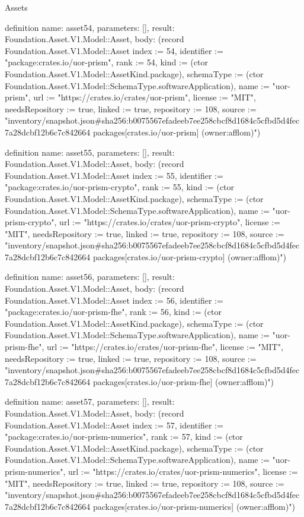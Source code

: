 \begin{lexlean}{Assets}
\begin{semanticmodule}
definition{
  name: asset54,
  parameters: [],
  result: Foundation.Asset.V1.Model::Asset,
  body: (record Foundation.Asset.V1.Model::Asset {index := 54, identifier := "package:crates.io/uor-prism", rank := 54, kind := (ctor Foundation.Asset.V1.Model::AssetKind.package), schemaType := (ctor Foundation.Asset.V1.Model::SchemaType.softwareApplication), name := "uor-prism", url := "https://crates.io/crates/uor-prism", license := "MIT", needsRepository := true, linked := true, repository := 108, source := "inventory/snapshot.json#sha256:b0075567efadeeb7ee258cbcf8d1684c5cfbd5d4fec7a28dcbf12b6c7c842664 packages[crates.io/uor-prism] (owner:afflom)"})
}

definition{
  name: asset55,
  parameters: [],
  result: Foundation.Asset.V1.Model::Asset,
  body: (record Foundation.Asset.V1.Model::Asset {index := 55, identifier := "package:crates.io/uor-prism-crypto", rank := 55, kind := (ctor Foundation.Asset.V1.Model::AssetKind.package), schemaType := (ctor Foundation.Asset.V1.Model::SchemaType.softwareApplication), name := "uor-prism-crypto", url := "https://crates.io/crates/uor-prism-crypto", license := "MIT", needsRepository := true, linked := true, repository := 108, source := "inventory/snapshot.json#sha256:b0075567efadeeb7ee258cbcf8d1684c5cfbd5d4fec7a28dcbf12b6c7c842664 packages[crates.io/uor-prism-crypto] (owner:afflom)"})
}

definition{
  name: asset56,
  parameters: [],
  result: Foundation.Asset.V1.Model::Asset,
  body: (record Foundation.Asset.V1.Model::Asset {index := 56, identifier := "package:crates.io/uor-prism-fhe", rank := 56, kind := (ctor Foundation.Asset.V1.Model::AssetKind.package), schemaType := (ctor Foundation.Asset.V1.Model::SchemaType.softwareApplication), name := "uor-prism-fhe", url := "https://crates.io/crates/uor-prism-fhe", license := "MIT", needsRepository := true, linked := true, repository := 108, source := "inventory/snapshot.json#sha256:b0075567efadeeb7ee258cbcf8d1684c5cfbd5d4fec7a28dcbf12b6c7c842664 packages[crates.io/uor-prism-fhe] (owner:afflom)"})
}

definition{
  name: asset57,
  parameters: [],
  result: Foundation.Asset.V1.Model::Asset,
  body: (record Foundation.Asset.V1.Model::Asset {index := 57, identifier := "package:crates.io/uor-prism-numerics", rank := 57, kind := (ctor Foundation.Asset.V1.Model::AssetKind.package), schemaType := (ctor Foundation.Asset.V1.Model::SchemaType.softwareApplication), name := "uor-prism-numerics", url := "https://crates.io/crates/uor-prism-numerics", license := "MIT", needsRepository := true, linked := true, repository := 108, source := "inventory/snapshot.json#sha256:b0075567efadeeb7ee258cbcf8d1684c5cfbd5d4fec7a28dcbf12b6c7c842664 packages[crates.io/uor-prism-numerics] (owner:afflom)"})
}


\end{semanticmodule}
\end{lexlean}
